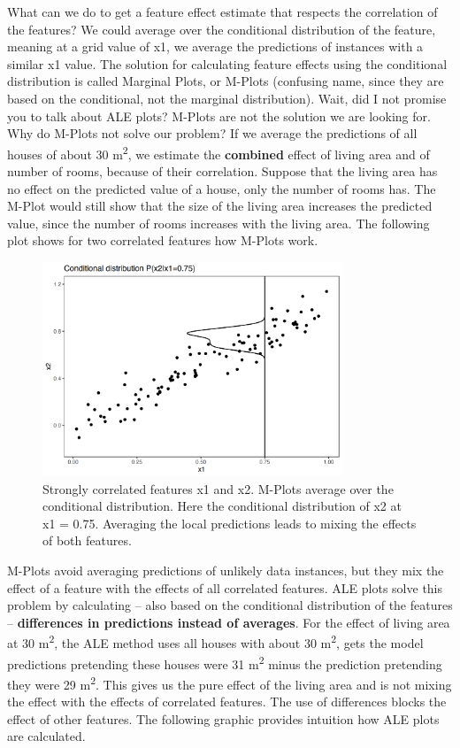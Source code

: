 \documentclass[
  10pt,
]{scrbook}
\begin{document}
What can we do to get a feature effect estimate that respects the correlation of the features?
We could average over the conditional distribution of the feature, meaning at a grid value of x1, we average the predictions of instances with a similar x1 value.
The solution for calculating feature effects using the conditional distribution is called Marginal Plots, or M-Plots (confusing name, since they are based on the conditional, not the marginal distribution).
Wait, did I not promise you to talk about ALE plots?
M-Plots are not the solution we are looking for.
Why do M-Plots not solve our problem?
If we average the predictions of all houses of about 30 m\textsuperscript{2}, we estimate the \textbf{combined} effect of living area and of number of rooms, because of their correlation.
Suppose that the living area has no effect on the predicted value of a house, only the number of rooms has.
The M-Plot would still show that the size of the living area increases the predicted value, since the number of rooms increases with the living area.
The following plot shows for two correlated features how M-Plots work.

\begin{figure}

{\centering \includegraphics[width=0.8\textwidth]{images/aleplot-motivation2-1} 

}

\caption{Strongly correlated features x1 and x2. M-Plots average over the conditional distribution. Here the conditional distribution of x2 at x1 = 0.75. Averaging the local predictions leads to mixing the effects of both features.}\label{fig:aleplot-motivation2}
\end{figure}

M-Plots avoid averaging predictions of unlikely data instances, but they mix the effect of a feature with the effects of all correlated features.
ALE plots solve this problem by calculating -- also based on the conditional distribution of the features -- \textbf{differences in predictions instead of averages}.
For the effect of living area at 30 m\textsuperscript{2}, the ALE method uses all houses with about 30 m\textsuperscript{2}, gets the model predictions pretending these houses were 31 m\textsuperscript{2} minus the prediction pretending they were 29 m\textsuperscript{2}.
This gives us the pure effect of the living area and is not mixing the effect with the effects of correlated features.
The use of differences blocks the effect of other features.
The following graphic provides intuition how ALE plots are calculated.
\end{document}

